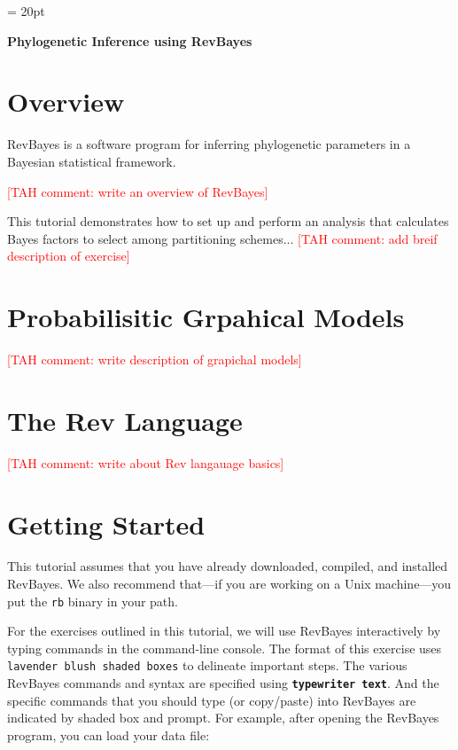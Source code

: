 \documentclass[11pt]{article}
\newcommand{\taha}[1]{{\textcolor{red}{[TAH comment: #1]}}} %
\newcommand{\cl}[1]{{\texttt{\textbf{#1}}}}
\begin{document}
\renewcommand{\headrulewidth}{0.5pt}
\headsep = 20pt
\lhead{ }

\thispagestyle{plain}
\begin{center}

\textbf{\LARGE Phylogenetic Inference using RevBayes}\\\vspace{4mm}
\end{center}

\section*{Overview}

RevBayes is a software program for inferring phylogenetic parameters in a Bayesian statistical framework. 
 
\taha{write an overview of RevBayes}

This tutorial demonstrates how to set up and perform an analysis that calculates Bayes factors to select among partitioning schemes...
\taha{add breif description of exercise}


\bigskip
\section*{Probabilisitic Grpahical Models}
\taha{write description of grapichal models}

\bigskip
\section*{The Rev Language}
\taha{write about Rev langauage basics}

\bigskip
\section*{Getting Started}

This tutorial assumes that you have already downloaded, compiled, and installed RevBayes. 
We also recommend that---if you are working on a Unix machine---you put the {\tt rb} binary in your path.

For the exercises outlined in this tutorial, we will use RevBayes interactively by typing commands in the command-line console.
The format of this exercise uses \colorbox{shadecolor}{\tt lavender blush shaded boxes} to delineate important steps. 
The various RevBayes commands and syntax are specified using \cl{typewriter text}. And the specific commands that you should type (or copy/paste) into RevBayes are indicated by shaded box and prompt. For example, after opening the RevBayes program, you can load your data file:
\end{document}

